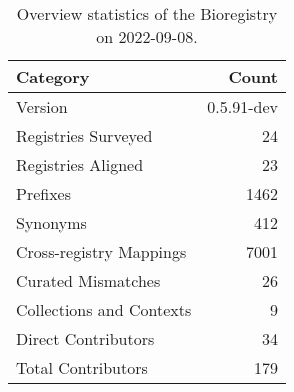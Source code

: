 \begin{table}
\centering
\caption{Overview statistics of the Bioregistry on 2022-09-08.}
\label{tab:bioregistry-summary}
\begin{tabular}{lr}
\toprule
                Category &      Count \\
\midrule
                 Version & 0.5.91-dev \\
     Registries Surveyed &         24 \\
      Registries Aligned &         23 \\
                Prefixes &       1462 \\
                Synonyms &        412 \\
 Cross-registry Mappings &       7001 \\
      Curated Mismatches &         26 \\
Collections and Contexts &          9 \\
     Direct Contributors &         34 \\
      Total Contributors &        179 \\
\bottomrule
\end{tabular}
\end{table}

